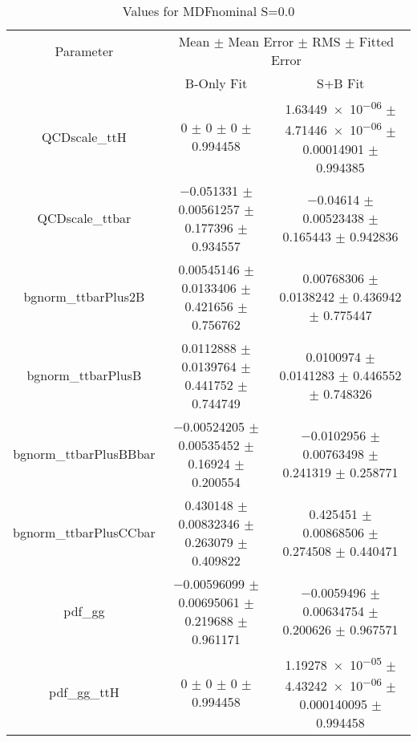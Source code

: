 \begin{table}
\centering
\caption{Values for MDFnominal S=0.0}
\begin{tabular}{ccc}
\toprule
Parameter & \multicolumn{2}{c}{Mean $\pm$ Mean Error $\pm$ RMS $\pm$ Fitted Error}\\
 & B-Only Fit & S+B Fit\\
\midrule
QCDscale\_ttH & \num{0} $\pm$ \num{0} $\pm$ \num{0} $\pm$ \num{0.994458} & \num{1.63449e-06} $\pm$ \num{4.71446e-06} $\pm$ \num{0.00014901} $\pm$ \num{0.994385}\\
QCDscale\_ttbar & \num{-0.051331} $\pm$ \num{0.00561257} $\pm$ \num{0.177396} $\pm$ \num{0.934557} & \num{-0.04614} $\pm$ \num{0.00523438} $\pm$ \num{0.165443} $\pm$ \num{0.942836}\\
bgnorm\_ttbarPlus2B & \num{0.00545146} $\pm$ \num{0.0133406} $\pm$ \num{0.421656} $\pm$ \num{0.756762} & \num{0.00768306} $\pm$ \num{0.0138242} $\pm$ \num{0.436942} $\pm$ \num{0.775447}\\
bgnorm\_ttbarPlusB & \num{0.0112888} $\pm$ \num{0.0139764} $\pm$ \num{0.441752} $\pm$ \num{0.744749} & \num{0.0100974} $\pm$ \num{0.0141283} $\pm$ \num{0.446552} $\pm$ \num{0.748326}\\
bgnorm\_ttbarPlusBBbar & \num{-0.00524205} $\pm$ \num{0.00535452} $\pm$ \num{0.16924} $\pm$ \num{0.200554} & \num{-0.0102956} $\pm$ \num{0.00763498} $\pm$ \num{0.241319} $\pm$ \num{0.258771}\\
bgnorm\_ttbarPlusCCbar & \num{0.430148} $\pm$ \num{0.00832346} $\pm$ \num{0.263079} $\pm$ \num{0.409822} & \num{0.425451} $\pm$ \num{0.00868506} $\pm$ \num{0.274508} $\pm$ \num{0.440471}\\
pdf\_gg & \num{-0.00596099} $\pm$ \num{0.00695061} $\pm$ \num{0.219688} $\pm$ \num{0.961171} & \num{-0.0059496} $\pm$ \num{0.00634754} $\pm$ \num{0.200626} $\pm$ \num{0.967571}\\
pdf\_gg\_ttH & \num{0} $\pm$ \num{0} $\pm$ \num{0} $\pm$ \num{0.994458} & \num{1.19278e-05} $\pm$ \num{4.43242e-06} $\pm$ \num{0.000140095} $\pm$ \num{0.994458}\\
\bottomrule
\end{tabular}
\end{table}